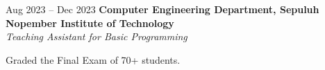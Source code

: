     \vspace{0.2 cm}

    \begin{twocolentry}{
        Aug 2023 – Dec 2023
    }
    \textbf{Computer Engineering Department, Sepuluh Nopember Institute of Technology}\\
    \textit{Teaching Assistant for Basic Programming}
    \end{twocolentry}

    \vspace{0.10 cm}

    \begin{onecolentry}
        \begin{highlights}
        \item Graded the Final Exam of 70+ students.
        \end{highlights}
    \end{onecolentry}
